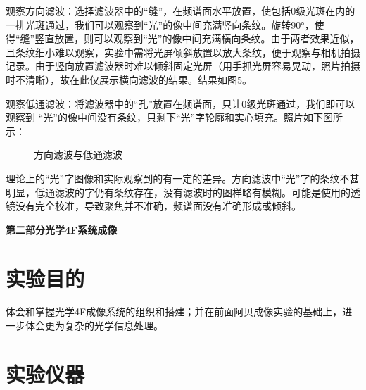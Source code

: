 \documentclass[11pt]{article}
\newcommand{\chapter}[2]{\begin{center}\bf\Large{第#1部分\quad #2}\end{center}}
\begin{document}
观察方向滤波：选择滤波器中的“缝”，在频谱面水平放置，使包括0级光斑在内的一排光斑通过，我们可以观察到“光”的像中间充满竖向条纹。旋转90°，使得“缝”竖直放置，则可以观察到“光”的像中间充满横向条纹。由于两者效果近似，且条纹细小难以观察，实验中需将光屏倾斜放置以放大条纹，便于观察与相机拍摄记录。由于竖向放置滤波器时难以倾斜固定光屏（用手抓光屏容易晃动，照片拍摄时不清晰），故在此仅展示横向滤波的结果。结果如图5。

观察低通滤波：将滤波器中的“孔”放置在频谱面，只让0级光斑通过，我们即可以观察到 “光”的像中间没有条纹，只剩下“光”字轮廓和实心填充。照片如下图所示：

\begin{figure}[H]
    \centering
    \caption{方向滤波与低通滤波}
\end{figure}

理论上的“光”字图像和实际观察到的有一定的差异。方向滤波中“光”字的条纹不甚明显，低通滤波的字仍有条纹存在，没有滤波时的图样略有模糊。可能是使用的透镜没有完全校准，导致聚焦并不准确，频谱面没有准确形成或倾斜。

\setcounter{section}{0}

\chapter{二}{光学4F系统成像}

\section{实验目的}

体会和掌握光学4F成像系统的组织和搭建；并在前面阿贝成像实验的基础上，进一步体会更为复杂的光学信息处理。

\section{实验仪器}
\end{document}
